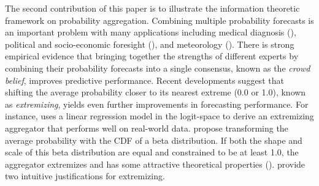 \documentclass[11pt,twoside]{article}
\begin{document}
The second contribution of this paper is to illustrate the information theoretic framework  on probability aggregation. Combining multiple probability forecasts is an important problem with many applications including medical diagnosis (\citet{wilson1998prediction, pepe2003statistical}), political and socio-economic foresight (\citet{tetlock2005expert}), and meteorology (\citet{sanders1963subjective, vislocky1995improved, baars2005performance}). There is strong empirical evidence that bringing together the strengths of different experts by combining their probability forecasts into a single consensus, known as the \textit{crowd belief},  improves predictive performance. Recent developments suggest that shifting the average probability closer to its nearest extreme (0.0 or 1.0), known as \textit{extremizing}, yields even further improvements in forecasting performance. For instance, \citet{satopaa} uses a linear regression model in the logit-space to derive an extremizing aggregator that performs well on real-world data. \citet{Ranjan08} propose transforming the average probability with the CDF of a beta distribution. If both the shape and scale of this beta distribution are equal and constrained to be at least 1.0,  the aggregator extremizes and has some attractive theoretical properties (\cite{Wallsten2001}).  \citet{Baron} provide  two intuitive justifications for extremizing.

\end{document}
